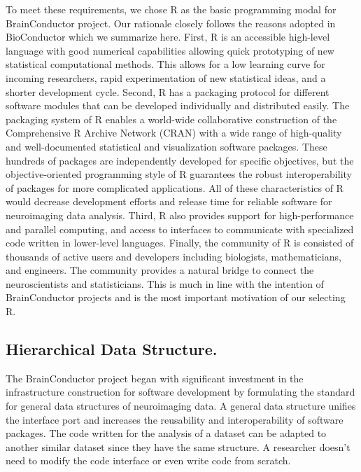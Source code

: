 \documentclass{nature}
\begin{document}
To meet these requirements, we chose R as the basic programming
modal for BrainConductor project. Our rationale closely follows
the reasons adopted in BioConductor which we summarize
here\cite{gentleman2004bioconductor}.
First, R is an accessible high-level language with
good numerical capabilities allowing quick prototyping of new statistical
computational methods. This allows for a low learning curve for
incoming researchers, rapid experimentation of
new statistical ideas, and a shorter development cycle.
Second, R has a packaging protocol for different software
modules that can be developed individually and distributed easily. The
packaging system of R enables a world-wide collaborative construction of the
Comprehensive R Archive Network (CRAN) with a wide range of
high-quality and well-documented statistical and visualization software
packages. These hundreds of packages are independently developed for specific
objectives, but the objective-oriented programming style of R guarantees the
robust interoperability of packages for more complicated applications. All of
these characteristics of R would decrease development efforts and release time
for reliable software for neuroimaging data analysis. 
Third, R also provides
support for high-performance\cite{buckner2010gputools} and parallel
computing\cite{schmidberger2009state}, 
and access to interfaces to communicate with specialized code
written in lower-level languages. 
Finally, the community of R is
consisted of thousands of active users and developers including biologists,
mathematicians, and engineers. The community provides a natural bridge to
connect the neuroscientists and statisticians. This is much in line with the
intention of BrainConductor projects and is the most important motivation of our
selecting R. 

 
\subsection{Hierarchical Data Structure.} The BrainConductor
project began with significant investment in the infrastructure construction for
software development by formulating the standard for general data structures of
neuroimaging data. A general data structure unifies the interface port and
increases the reusability and interoperability of software packages. The code
written for the analysis of a dataset can be adapted to another similar dataset
since they have the same structure. A researcher doesn't need to modify the code
interface or even write code from scratch. 
\end{document}
